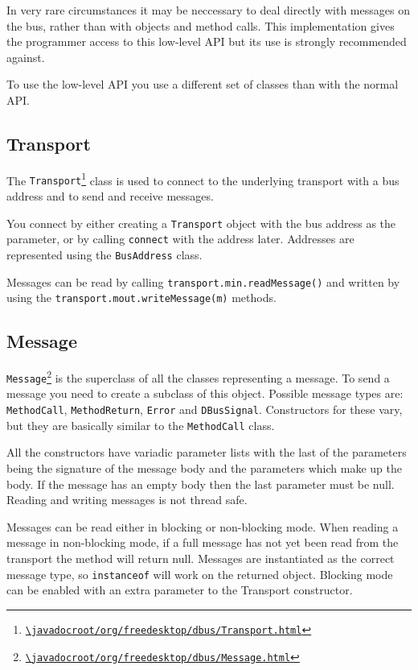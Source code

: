 \documentclass[a4paper,12pt]{article}
\begin{document}
In very rare circumstances it may be neccessary to deal directly with messages
on the bus, rather than with objects and method calls. This implementation
gives the programmer access to this low-level API but its use is strongly
recommended against.

To use the low-level API you use a different set of classes than with the
normal API.

\subsection{Transport}

The {\tt Transport\footnote{\url{\javadocroot/org/freedesktop/dbus/Transport.html}}}
class is used to connect to the underlying transport with a bus address and to
send and receive messages. 

You connect by either creating a {\tt Transport} object with the bus address as
the parameter, or by calling {\tt connect} with the address later. Addresses
are represented using the {\tt BusAddress} class.

Messages can be read by calling {\tt transport.min.readMessage()} and written
by using the {\tt transport.mout.writeMessage(m)} methods.

\subsection{Message}

{\tt Message\footnote{\url{\javadocroot/org/freedesktop/dbus/Message.html}}} is the
superclass of all the classes representing a message. To send a message you
need to create a subclass of this object. Possible message types are: {\tt
MethodCall}, {\tt MethodReturn}, {\tt Error} and {\tt DBusSignal}. Constructors
for these vary, but they are basically similar to the {\tt MethodCall} class.

All the constructors have variadic parameter lists with the last of the
parameters being the signature of the message body and the parameters which
make up the body. If the message has an empty body then the last parameter must
be null. Reading and writing messages is not thread safe.

Messages can be read either in blocking or non-blocking mode. When reading a
message in non-blocking mode, if a full message has not yet been read from the
transport the method will return null. Messages are instantiated as the correct
message type, so {\tt instanceof} will work on the returned object. Blocking
mode can be enabled with an extra parameter to the Transport constructor.
\end{document}

